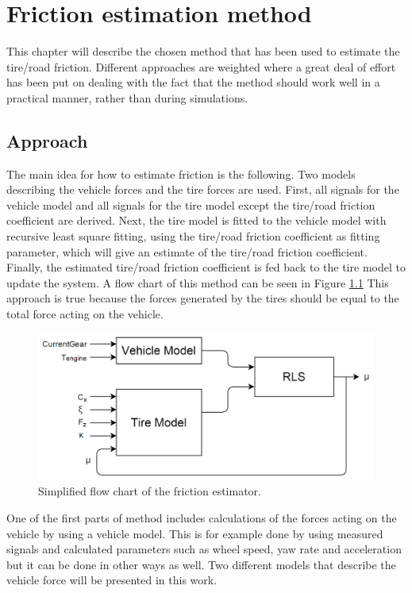 \chapter{Friction estimation method}

This chapter will describe the chosen method that has been used to estimate the tire/road friction. Different approaches are weighted where a great deal of effort has been put on dealing with the fact that the method should work well in a practical manner, rather than during simulations.

\section{Approach}
The main idea for how to estimate friction is the following. Two models describing the vehicle forces and the tire forces are used. First, all signals for the vehicle model and all signals for the tire model except the tire/road friction coefficient are derived. Next, the tire model is fitted to the vehicle model with recursive least square fitting, using the tire/road friction coefficient as fitting parameter, which will give an estimate of the tire/road friction coefficient. Finally, the estimated tire/road friction coefficient is fed back to the tire model to update the system. A flow chart of this method can be seen in Figure \ref{friction_estimator} This approach is true because the forces generated by the tires should be equal to the total force acting on the vehicle.

\begin{figure}[h]
	\centering
	\includegraphics[width=1.0\textwidth]{Pictures/friction_estimator}
	\caption {Simplified flow chart of the friction estimator. }
	\label{friction_estimator}
\end{figure}

One of the first parts of method includes calculations of the forces acting on the vehicle by using a vehicle model. This is for example done by using measured signals and calculated parameters such as wheel speed, yaw rate and acceleration but it can be done in other ways as well. Two different models that describe the vehicle force will be presented in this work. 


